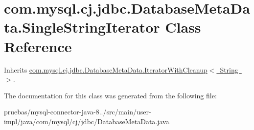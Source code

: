 \hypertarget{classcom_1_1mysql_1_1cj_1_1jdbc_1_1_database_meta_data_1_1_single_string_iterator}{}\section{com.\+mysql.\+cj.\+jdbc.\+Database\+Meta\+Data.\+Single\+String\+Iterator Class Reference}
\label{classcom_1_1mysql_1_1cj_1_1jdbc_1_1_database_meta_data_1_1_single_string_iterator}


Inherits \mbox{\hyperlink{classcom_1_1mysql_1_1cj_1_1jdbc_1_1_database_meta_data_1_1_iterator_with_cleanup}{com.\+mysql.\+cj.\+jdbc.\+Database\+Meta\+Data.\+Iterator\+With\+Cleanup$<$ String $>$}}.



The documentation for this class was generated from the following file\+:\begin{DoxyCompactItemize}
\item 
pruebas/mysql-\/connector-\/java-\/8../src/main/user-\/impl/java/com/mysql/cj/jdbc/Database\+Meta\+Data.\+java\end{DoxyCompactItemize}
